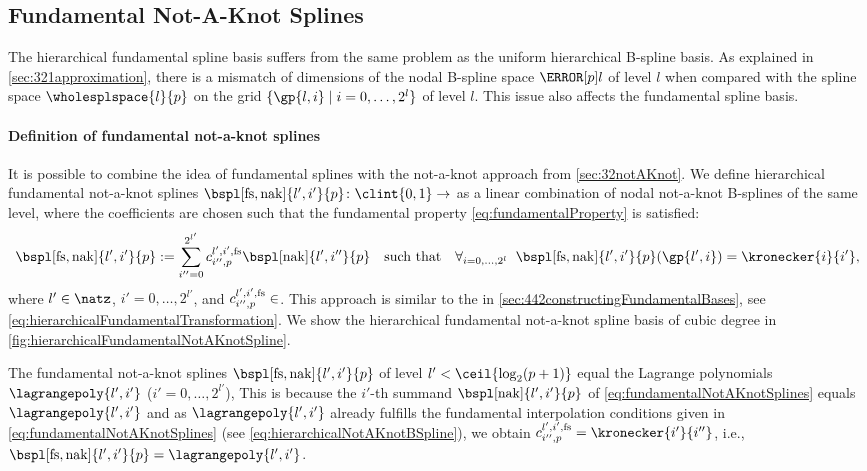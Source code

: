 \subsection{Fundamental Not-A-Knot Splines}
\label{sec:445fundamentalNotAKnotSplines}

The hierarchical fundamental spline basis suffers from the same problem
as the uniform hierarchical B-spline basis.
As explained in \cref{sec:321approximation}, there is a mismatch
of dimensions of the nodal B-spline space $\nsbspl{l}{p}$ of level $l$
when compared with the spline space $\wholesplspace{l}{p}$ on the grid
$\{\gp{l,i} \mid i = 0, \dotsc, 2^l\}$ of level $l$.
This issue also affects the fundamental spline basis.

\paragraph{Definition of fundamental not-a-knot splines}

It is possible to combine the idea of fundamental splines
with the not-a-knot approach from \cref{sec:32notAKnot}.
We define hierarchical fundamental not-a-knot splines
$\bspl[\fs,\nak]{l',i'}{p}\colon \clint{0, 1} \to \real$ as a
linear combination of nodal not-a-knot B-splines of the same level,
where the coefficients are chosen such that the
fundamental property \eqref{eq:fundamentalProperty} is satisfied:
\begin{equation}
  \label{eq:fundamentalNotAKnotSplines}
  \bspl[\fs,\nak]{l',i'}{p}
  := \sum_{i''=0}^{2^{l'}}
  \fundsplcoeff[l',i',\fs]{i''}{p} \bspl[\nak]{l',i''}{p}
  \quad\text{such that}\quad
  \falarge{i = 0, \dotsc, 2^l}{
    \bspl[\fs,\nak]{l',i'}{p}(\gp{l',i}) = \kronecker{i}{i'}
  },
\end{equation}
where $l' \in \natz$, $i' = 0, \dotsc, 2^{l'}$, and
$\fundsplcoeff[l',i',\fs]{i''}{p} \in \real$.
This approach is similar to the \hftr in
\cref{sec:442constructingFundamentalBases},
see \cref{eq:hierarchicalFundamentalTransformation}.
We show the hierarchical fundamental not-a-knot spline basis
of cubic degree in \cref{fig:hierarchicalFundamentalNotAKnotSpline}.

The fundamental not-a-knot splines $\bspl[\fs,\nak]{l',i'}{p}$
of level $l' < \ceil{\log_2(p+1)}$ equal the Lagrange polynomials
$\lagrangepoly{l',i'}$ ($i' = 0, \dotsc, 2^{l'}$),
This is because the $i'$-th summand $\bspl[\nak]{l',i'}{p}$
of \eqref{eq:fundamentalNotAKnotSplines} equals $\lagrangepoly{l',i'}$ and
as $\lagrangepoly{l',i'}$ already fulfills the
fundamental interpolation conditions given in
\eqref{eq:fundamentalNotAKnotSplines}
(see \cref{eq:hierarchicalNotAKnotBSpline}),
we obtain $\fundsplcoeff[l',i',\fs]{i''}{p} = \kronecker{i'}{i''}$, i.e.,
$\bspl[\fs,\nak]{l',i'}{p} = \lagrangepoly{l',i'}$.

